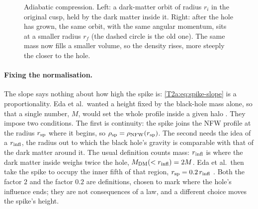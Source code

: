 \begin{figure}[htbp]
\centering
{}
\caption{Adiabatic compression. Left: a dark-matter orbit of radius $r_i$ in the original cusp, held by the dark matter inside it. Right: after the hole has grown, the same orbit, with the same angular momentum, sits at a smaller radius $r_f$ (the dashed circle is the old one). The same mass now fills a smaller volume, so the density rises, more steeply the closer to the hole.}
\label{T2a:fig:adiabatic}
\end{figure}

\paragraph{Fixing the normalisation.}
The slope says nothing about how high the spike is: \eqref{T2a:eq:spike-slope} is a proportionality. Eda et al.\ wanted a height fixed by the black-hole mass alone, so that a single number, $M$, would set the whole profile inside a given halo \cite[Sec.~II B]{Eda2015}. They impose two conditions. The first is continuity: the spike joins the NFW profile at the radius $r_{\rm sp}$ where it begins, so $\rho_{\rm sp}=\rho_{\rm NFW}(r_{\rm sp})$. The second needs the idea of a  $r_{\rm infl}$, the radius out to which the black hole's gravity is comparable with that of the dark matter around it. The usual definition counts mass: $r_{\rm infl}$ is where the dark matter inside weighs twice the hole, $M_{\rm DM}(<r_{\rm infl})=2M$. Eda et al.\ then take the spike to occupy the inner fifth of that region, $r_{\rm sp}=0.2\,r_{\rm infl}$ \cite[eqs.~(4)--(5)]{Eda2015}. Both the factor $2$ and the factor $0.2$ are definitions, chosen to mark where the hole's influence ends; they are not consequences of a law, and a different choice moves the spike's height.

